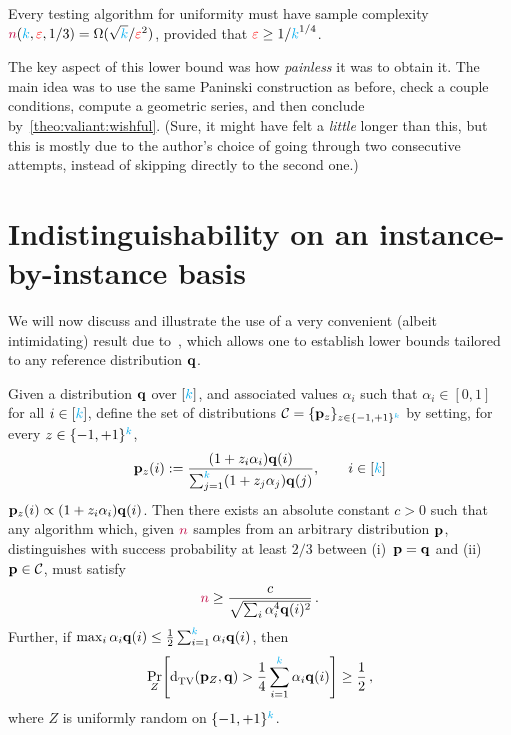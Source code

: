 \begin{theorem}
  \label{prop:uniformity:lb:valiant}
Every testing algorithm for uniformity must have sample complexity ${\textcolor{purple}{n}}({\textcolor{cyan}{k}},\textcolor{red}{\varepsilon},1/3) = \Omega(\sqrt{{\textcolor{cyan}{k}}}/\textcolor{red}{\varepsilon}^2)$, provided that $\textcolor{red}{\varepsilon} \geq 1/{\textcolor{cyan}{k}}^{1/4}$.
\end{theorem}
The key aspect of this lower bound was how \emph{painless} it was to obtain it. The main idea was to use the same Paninski construction as before, check a couple conditions, compute a geometric series, and then conclude by~\cref{theo:valiant:wishful}. (Sure, it might have felt a \emph{little} longer than this, but this is mostly due to the author's choice of going through two consecutive attempts, instead of skipping directly to the second one.)


\section{Indistinguishability on an instance-by-instance basis}
	\label{ssec:vv:instancebyinstance}
We will now discuss and illustrate the use of a very convenient (albeit intimidating) result due to~\citet{ValiantV17}, which allows one to establish lower bounds tailored to any reference distribution $\mathbf{q}$.
\begin{theorem}
        \label{theo:vv:lb}
    Given a distribution $\mathbf{q}$ over $[{\textcolor{cyan}{k}}]$, and associated values $\alpha_i$ such that $\alpha_i \in [0,1]$ for all $i\in[{\textcolor{cyan}{k}}]$, define the set of distributions $\mathcal{C}=\{\mathbf{p}_z\}_{z\in\{-1,+1\}^{\textcolor{cyan}{k}}}$ by setting, for every $z\in\{-1,+1\}^{\textcolor{cyan}{k}}$,
\begin{equation}
	\label{eq:vv:def:hardcase}
    		\mathbf{p}_z(i) := \frac{(1+z_i\alpha_i)\mathbf{q}(i)}{\sum_{j=1}^{\textcolor{cyan}{k}} (1+z_j\alpha_j)\mathbf{q}(j) }, \qquad i\in[{\textcolor{cyan}{k}}]
\end{equation}
 \ie $\mathbf{p}_z(i) \propto (1+z_i\alpha_i)\mathbf{q}(i)$. 
Then there exists an absolute constant $c>0$ such that any algorithm which, given ${\textcolor{purple}{n}}$ \iid samples from an arbitrary distribution $\mathbf{p}$, distinguishes with success probability at least $2/3$ between (i)~$\mathbf{p}=\mathbf{q}$ and (ii)~$\mathbf{p}\in\mathcal{C}$, must satisfy
\begin{equation}
	\label{eq:vv:lb:samples}
		{\textcolor{purple}{n}} \geq \frac{c}{\sqrt{\sum_i \alpha_i^4\mathbf{q}(i)^2}}\,.
\end{equation}
Further, if $\max_{i} \alpha_i\mathbf{q}(i) \leq \frac{1}{2}\sum_{i=1}^{\textcolor{cyan}{k}} \alpha_i\mathbf{q}(i)$, then
\begin{equation}
	\label{eq:vv:proba:far}
	\bP{Z}{\totalvardist{\p_Z}{\q} > \frac{1}{4}\sum_{i=1}^\ab \alpha_i\q(i) } \geq \frac{1}{2}\,,
\end{equation}
where $Z$ is uniformly random on $\{-1,+1\}^{\textcolor{cyan}{k}}$.
\end{theorem}
